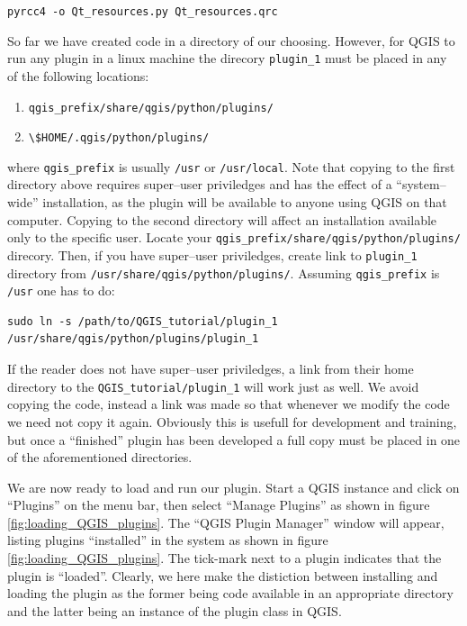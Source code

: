 \lstinline{pyrcc4 -o Qt_resources.py Qt_resources.qrc}
\par%
So far we have created code in a directory of our choosing. However, for QGIS to run any plugin in a linux machine the direcory \lstinline{plugin_1} must be placed in any of the following locations:
\begin{enumerate}
  \item \lstinline{qgis_prefix/share/qgis/python/plugins/}
  \item \lstinline{\$HOME/.qgis/python/plugins/}
\end{enumerate}
where  \lstinline{qgis_prefix} is usually \lstinline{/usr} or \lstinline{/usr/local}. Note that copying to the first directory above requires super--user priviledges and has the effect of a ``system--wide'' installation, as the plugin will be available to anyone using QGIS on that computer. Copying to the second directory will affect an installation available only to the specific user. Locate your \lstinline{qgis_prefix/share/qgis/python/plugins/} direcory. Then, if you have super--user priviledges, create link to \lstinline{plugin_1} directory from \lstinline{/usr/share/qgis/python/plugins/}. Assuming \lstinline{qgis_prefix} is \lstinline{/usr} one has to do:
\begin{lstlisting}
sudo ln -s /path/to/QGIS_tutorial/plugin_1 /usr/share/qgis/python/plugins/plugin_1
\end{lstlisting}
If the reader does not have super--user priviledges, a link from their home directory to the \lstinline{QGIS_tutorial/plugin_1} will work just as well. We avoid copying the code, instead a link was made so that whenever we modify the code we need not copy it again. Obviously this is usefull for development and training, but once a ``finished'' plugin has been developed a full copy must be placed in one of the aforementioned directories.
\par%
We are now ready to load and run our plugin. Start a QGIS instance and click on ``Plugins'' on the menu bar, then select ``Manage Plugins'' as shown in figure \ref{fig:loading_QGIS_plugins}. The ``QGIS Plugin Manager'' window will appear, listing plugins ``installed'' in the system as shown in figure \ref{fig:loading_QGIS_plugins}. The tick-mark next to a plugin indicates that the plugin is ``loaded''. Clearly, we here make the distiction between installing and loading the plugin as the former being code available in an appropriate directory and the latter being an instance of the plugin class in QGIS.

